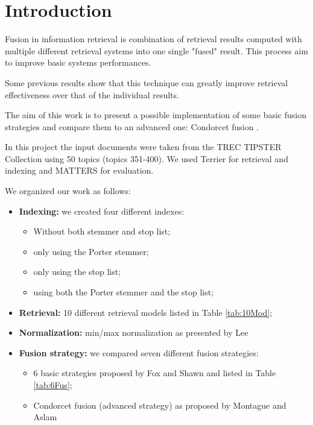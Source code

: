 


    \printTitle
    \newpage
    \tableofcontents
    \newpage

    \section{Introduction}
      Fusion in information retrieval is combination of retrieval results computed with multiple different retrieval systems into one single "fused" result. This process aim to improve basic systems performances. 
   
   Some previous results show that this technique  can greatly improve retrieval
   effectiveness over that of the individual results.
   
   The aim of this work is to present a possible implementation of some basic
   fusion strategies and compare them to an advanced one: Condorcet fusion \cite{3}.
   
   In this project the input documents were taken from the TREC TIPSTER Collection using 50 topics (topics 351-400).
   We used Terrier for retrieval and indexing and MATTERS for evaluation.
   
   We organized our work as follows:

    \begin{itemize}
        \item \textbf{Indexing:} we created four different indexes:
        \begin{itemize}
        	\item Without both stemmer and stop list;
        	\item only using the Porter stemmer;
        	\item only using the stop list;
        	\item using both the Porter stemmer and the stop list;
        \end{itemize}
        \item \textbf{Retrieval:} 10 different retrieval models listed in Table \ref{tab:10Mod};
		\item \textbf{Normalization:} min/max normalization as presented by Lee \cite{1}
        \item \textbf{Fusion strategy:} we compared seven different fusion strategies:
            \begin{itemize}
                \item 6 basic strategies proposed by Fox and Shawn \cite{2} and listed in Table \ref{tab:6Fus};
                \item Condorcet fusion (advanced strategy) as proposed by Montague and Aslam \cite{3}
            \end{itemize}
    \end{itemize}


